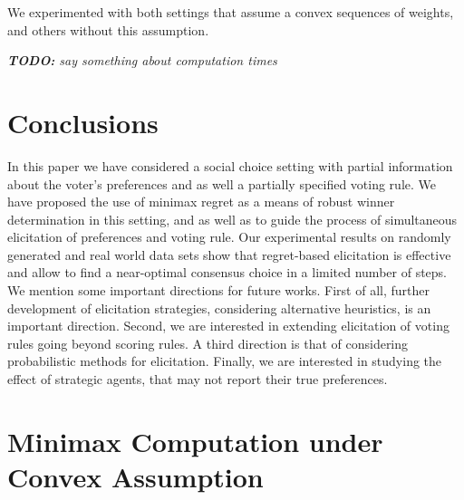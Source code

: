 We experimented with both settings that assume a convex sequences of weights, and others without this assumption.

{\em {\bf TODO:} say something about computation times}


\section{Conclusions}  \label{sec:conclusions}

In this paper we have considered a  social choice setting with partial  information about the voter's  
preferences and as well a partially specified voting rule.
We have proposed the use of minimax regret as a means of robust winner determination in this setting, and as well as to guide the process of simultaneous elicitation of preferences and voting rule.
Our experimental results on randomly generated and real world data sets show that regret-based elicitation is effective and allow to find a near-optimal consensus choice in a limited number of steps.
We mention some  important directions for future works.
First of all, further development of elicitation strategies, considering alternative heuristics, is an important direction. 
Second, we are interested in extending elicitation of voting rules going beyond scoring rules.
A third direction is that of considering probabilistic methods for elicitation.
Finally, we are interested in studying the effect of strategic agents, that may not report their true preferences.



% 

\pagebreak
\ifappendix
\appendix
\section{Minimax Computation under Convex Assumption} 


